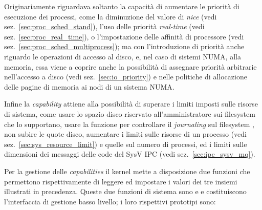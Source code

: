 
Originariamente  riguardava soltanto la capacità di
aumentare le priorità di esecuzione dei processi, come la diminuzione del
valore di \textit{nice} (vedi sez.~\ref{sec:proc_sched_stand}), l'uso delle
priorità \textit{real-time} (vedi sez.~\ref{sec:proc_real_time}), o
l'impostazione delle affinità di processore (vedi
sez.~\ref{sec:proc_sched_multiprocess}); ma con l'introduzione di priorità
anche riguardo le operazioni di accesso al disco, e, nel caso di sistemi NUMA,
alla memoria, essa viene a coprire anche la possibilità di assegnare priorità
arbitrarie nell'accesso a disco (vedi sez.~\ref{sec:io_priority}) e nelle
politiche di allocazione delle pagine di memoria ai nodi di un sistema NUMA.


Infine la \textit{capability}  attiene alla
possibilità di superare i limiti imposti sulle risorse di sistema, come usare
lo spazio disco riservato all'amministratore sui filesystem che lo supportano,
usare la funzione  per controllare il \textit{journaling} sul
filesystem , non subire le quote disco, aumentare i limiti sulle
risorse di un processo (vedi sez.~\ref{sec:sys_resource_limit}) e quelle sul
numero di processi, ed i limiti sulle dimensioni dei messaggi delle code del
SysV IPC (vedi sez.~\ref{sec:ipc_sysv_mq}).


Per la gestione delle \textit{capabilities} il kernel mette a disposizione due
funzioni che permettono rispettivamente di leggere ed impostare i valori dei
tre insiemi illustrati in precedenza. Queste due funzioni di sistema sono
 e  e costituiscono l'interfaccia di gestione
basso livello; i loro rispettivi prototipi sono:

